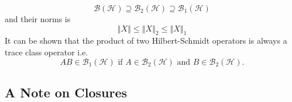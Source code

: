 \documentclass[aps,preprint]{revtex4}%
\begin{document}
\begin{equation}
\mathcal{B}\left(  \mathcal{H}\right)  \supseteq\mathcal{B}_{2}\left(
\mathcal{H}\right)  \supseteq\mathcal{B}_{1}\left(  \mathcal{H}\right)
\end{equation}
and their norms is
\begin{equation}
\left\Vert X\right\Vert \leq\left\Vert X\right\Vert _{2}\leq\left\Vert
X\right\Vert _{1}%
\end{equation}
It can be shown that the product of two Hilbert-Schmidt operators is always a
trace class operator i.e.
\begin{equation}
AB\in\mathcal{B}_{1}\left(  \mathcal{H}\right)  \text{ if }A\in\mathcal{B}%
_{2}\left(  \mathcal{H}\right)  \text{ and }B\in\mathcal{B}_{2}\left(
\mathcal{H}\right)  .
\end{equation}


\subsection{A Note on Closures}
\end{document}
